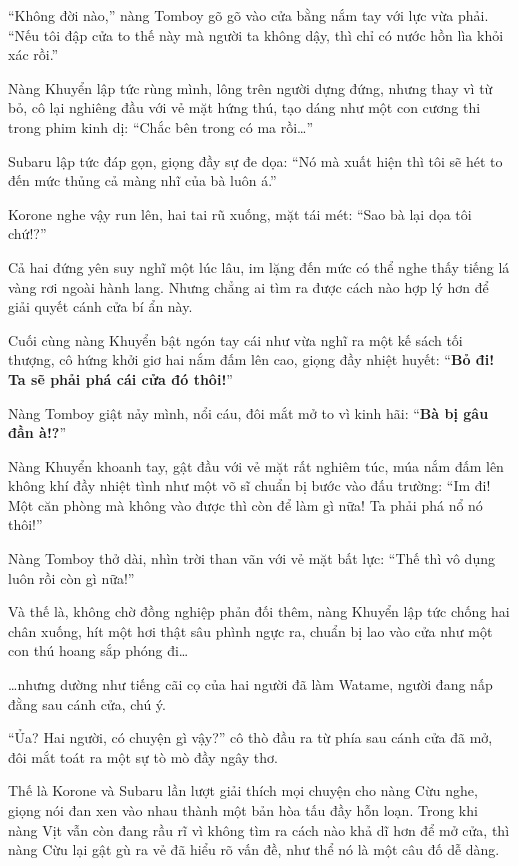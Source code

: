 \documentclass[../main.tex]{subfiles}
\begin{document}
``Không đời nào,'' nàng Tomboy gõ gõ vào cửa bằng nắm tay với lực vừa phải. ``Nếu tôi đập cửa to thế này mà người ta không dậy, thì chỉ có nước hồn lìa khỏi xác rồi.''

Nàng Khuyển lập tức rùng mình, lông trên người dựng đứng, nhưng thay vì từ bỏ, cô lại nghiêng đầu với vẻ mặt hứng thú, tạo dáng như một con cương thi trong phim kinh dị: ``Chắc bên trong có ma rồi\dots''

Subaru lập tức đáp gọn, giọng đầy sự đe dọa: ``Nó mà xuất hiện thì tôi sẽ hét to đến mức thủng cả màng nhĩ của bà luôn á.''

Korone nghe vậy run lên, hai tai rũ xuống, mặt tái mét: ``Sao bà lại dọa tôi chứ!?''

Cả hai đứng yên suy nghĩ một lúc lâu, im lặng đến mức có thể nghe thấy tiếng lá vàng rơi ngoài hành lang. Nhưng chẳng ai tìm ra được cách nào hợp lý hơn để giải quyết cánh cửa bí ẩn này.

Cuối cùng nàng Khuyển bật ngón tay cái như vừa nghĩ ra một kế sách tối thượng, cô hứng khởi giơ hai nắm đấm lên cao, giọng đầy nhiệt huyết: ``\textbf{Bỏ đi! Ta sẽ phải phá cái cửa đó thôi!}''

Nàng Tomboy giật nảy mình, nổi cáu, đôi mắt mở to vì kinh hãi: ``\textbf{Bà bị gâu đần à!?}''


Nàng Khuyển khoanh tay, gật đầu với vẻ mặt rất nghiêm túc, múa nắm đấm lên không khí đầy nhiệt tình như một võ sĩ chuẩn bị bước vào đấu trường: ``Im đi! Một căn phòng mà không vào được thì còn để làm gì nữa! Ta phải phá nổ nó thôi!''

Nàng Tomboy thở dài, nhìn trời than vãn với vẻ mặt bất lực: ``Thế thì vô dụng luôn rồi còn gì nữa!''

Và thế là, không chờ đồng nghiệp phản đối thêm, nàng Khuyển lập tức chống hai chân xuống, hít một hơi thật sâu phình ngực ra, chuẩn bị lao vào cửa như một con thú hoang sắp phóng đi\dots

\dots nhưng dường như tiếng cãi cọ của hai người đã làm Watame, người đang nấp đằng sau cánh cửa, chú ý.

``Ủa? Hai người, có chuyện gì vậy?'' cô thò đầu ra từ phía sau cánh cửa đã mở, đôi mắt toát ra một sự tò mò đầy ngây thơ.

Thế là Korone và Subaru lần lượt giải thích mọi chuyện cho nàng Cừu nghe, giọng nói đan xen vào nhau thành một bản hòa tấu đầy hỗn loạn. Trong khi nàng Vịt vẫn còn đang rầu rĩ vì không tìm ra cách nào khả dĩ hơn để mở cửa, thì nàng Cừu lại gật gù ra vẻ đã hiểu rõ vấn đề, như thể nó là một câu đố dễ dàng.
\end{document}
